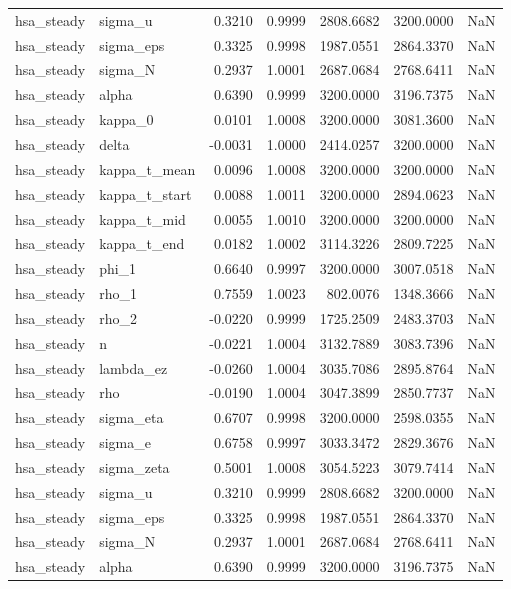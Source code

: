 \begin{tabular}{llrrrrl}
hsa\_steady & sigma\_u & 0.3210 & 0.9999 & 2808.6682 & 3200.0000 & NaN \\
hsa\_steady & sigma\_eps & 0.3325 & 0.9998 & 1987.0551 & 2864.3370 & NaN \\
hsa\_steady & sigma\_N & 0.2937 & 1.0001 & 2687.0684 & 2768.6411 & NaN \\
hsa\_steady & alpha & 0.6390 & 0.9999 & 3200.0000 & 3196.7375 & NaN \\
hsa\_steady & kappa\_0 & 0.0101 & 1.0008 & 3200.0000 & 3081.3600 & NaN \\
hsa\_steady & delta & -0.0031 & 1.0000 & 2414.0257 & 3200.0000 & NaN \\
hsa\_steady & kappa\_t\_mean & 0.0096 & 1.0008 & 3200.0000 & 3200.0000 & NaN \\
hsa\_steady & kappa\_t\_start & 0.0088 & 1.0011 & 3200.0000 & 2894.0623 & NaN \\
hsa\_steady & kappa\_t\_mid & 0.0055 & 1.0010 & 3200.0000 & 3200.0000 & NaN \\
hsa\_steady & kappa\_t\_end & 0.0182 & 1.0002 & 3114.3226 & 2809.7225 & NaN \\
hsa\_steady & phi\_1 & 0.6640 & 0.9997 & 3200.0000 & 3007.0518 & NaN \\
hsa\_steady & rho\_1 & 0.7559 & 1.0023 & 802.0076 & 1348.3666 & NaN \\
hsa\_steady & rho\_2 & -0.0220 & 0.9999 & 1725.2509 & 2483.3703 & NaN \\
hsa\_steady & n & -0.0221 & 1.0004 & 3132.7889 & 3083.7396 & NaN \\
hsa\_steady & lambda\_ez & -0.0260 & 1.0004 & 3035.7086 & 2895.8764 & NaN \\
hsa\_steady & rho & -0.0190 & 1.0004 & 3047.3899 & 2850.7737 & NaN \\
hsa\_steady & sigma\_eta & 0.6707 & 0.9998 & 3200.0000 & 2598.0355 & NaN \\
hsa\_steady & sigma\_e & 0.6758 & 0.9997 & 3033.3472 & 2829.3676 & NaN \\
hsa\_steady & sigma\_zeta & 0.5001 & 1.0008 & 3054.5223 & 3079.7414 & NaN \\
hsa\_steady & sigma\_u & 0.3210 & 0.9999 & 2808.6682 & 3200.0000 & NaN \\
hsa\_steady & sigma\_eps & 0.3325 & 0.9998 & 1987.0551 & 2864.3370 & NaN \\
hsa\_steady & sigma\_N & 0.2937 & 1.0001 & 2687.0684 & 2768.6411 & NaN \\
hsa\_steady & alpha & 0.6390 & 0.9999 & 3200.0000 & 3196.7375 & NaN \\

\end{tabular}
